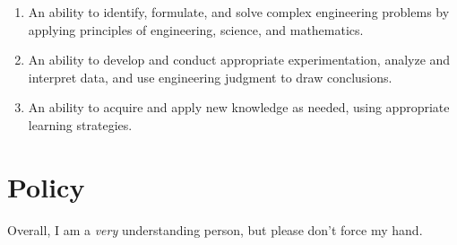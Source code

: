 \documentclass{article}
\begin{document}
\begin{enumerate}
	\slshape

	\item
		An ability to identify, formulate, and solve complex
		engineering problems by applying principles of
		engineering, science, and mathematics.

	\setcounter{enumi}{5}

	\item
		An ability to develop and conduct appropriate
		experimentation, analyze and interpret data, and use
		engineering judgment to draw conclusions.

	\item
		An ability to acquire and apply new knowledge as needed,
		using appropriate learning strategies.
\end{enumerate}

\section{Policy}

Overall, I am a \emph{very} understanding person, but please don't force
my hand.
\end{document}
